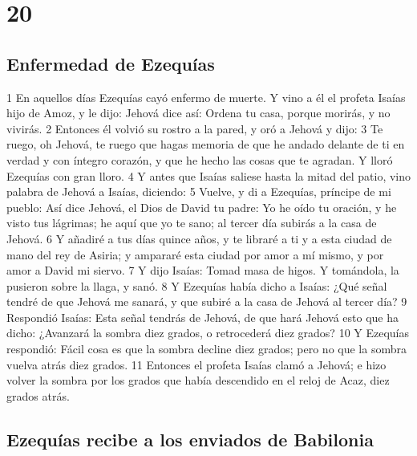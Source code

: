 \chapter{20}

\section*{Enfermedad de Ezequías}

1 En aquellos días Ezequías cayó enfermo de muerte. Y vino a él el profeta Isaías hijo de Amoz, y le dijo: Jehová dice así: Ordena tu casa, porque morirás, y no vivirás.
2 Entonces él volvió su rostro a la pared, y oró a Jehová y dijo:
3 Te ruego, oh Jehová, te ruego que hagas memoria de que he andado delante de ti en verdad y con íntegro corazón, y que he hecho las cosas que te agradan. Y lloró Ezequías con gran lloro.
4 Y antes que Isaías saliese hasta la mitad del patio, vino palabra de Jehová a Isaías, diciendo:
5 Vuelve, y di a Ezequías, príncipe de mi pueblo: Así dice Jehová, el Dios de David tu padre: Yo he oído tu oración, y he visto tus lágrimas; he aquí que yo te sano; al tercer día subirás a la casa de Jehová. 
6 Y añadiré a tus días quince años, y te libraré a ti y a esta ciudad de mano del rey de Asiria; y ampararé esta ciudad por amor a mí mismo, y por amor a David mi siervo.
7 Y dijo Isaías: Tomad masa de higos. Y tomándola, la pusieron sobre la llaga, y sanó.
8 Y Ezequías había dicho a Isaías: ¿Qué señal tendré de que Jehová me sanará, y que subiré a la casa de Jehová al tercer día?
9 Respondió Isaías: Esta señal tendrás de Jehová, de que hará Jehová esto que ha dicho: ¿Avanzará la sombra diez grados, o retrocederá diez grados?
10 Y Ezequías respondió: Fácil cosa es que la sombra decline diez grados; pero no que la sombra vuelva atrás diez grados.
11 Entonces el profeta Isaías clamó a Jehová; e hizo volver la sombra por los grados que había descendido en el reloj de Acaz, diez grados atrás.

\section*{Ezequías recibe a los enviados de Babilonia}


